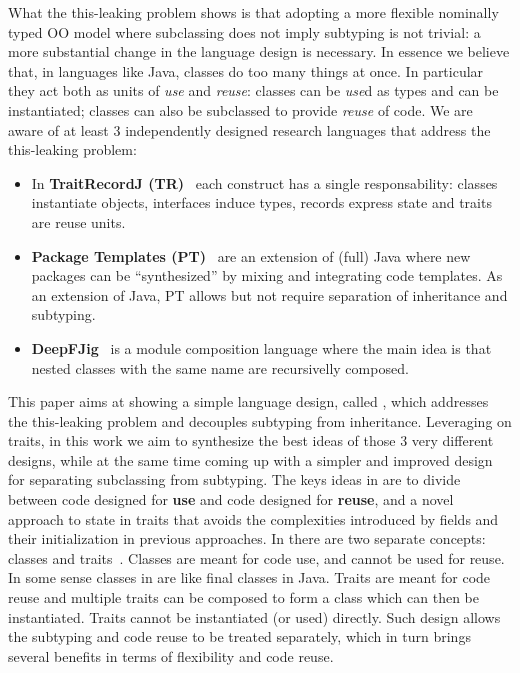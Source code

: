 What the this-leaking problem shows is that adopting a more flexible
nominally typed OO model where subclassing does not imply subtyping is
not trivial: a more substantial change in the language design is
necessary.  In essence we believe that, in languages like Java, classes do too many
things at once. In particular they act both as units of \emph{use} and
\emph{reuse}: classes can be \emph{use}d as types and can be instantiated;
classes can also be subclassed to provide \emph{reuse} of code.
We are aware of at least 3 independently designed research
languages that address the this-leaking problem:
\begin{itemize}
\item In {\bf TraitRecordJ (TR)}~\cite{Bettini:2010:ISP:1774088.1774530,BETTINI2013521,Bettini2015282}
each  construct has a single responsability: classes instantiate objects,
interfaces induce types, records express state and traits are reuse units.
\item {\bf Package Templates (PT)}~\cite{KrogdahlMS09,DBLP:journals/taosd/AxelsenSKM12,DBLP:conf/gpce/AxelsenK12}
are an extension of (full) Java where new packages can be ``synthesized'' by mixing
and integrating code templates. As an extension of Java, PT allows but not require
separation of inheritance and subtyping.
\item {\bf
    DeepFJig}~\cite{deep,servetto2014meta,fjig} is
a module composition language where the main idea is that
nested classes with the same name are recursivelly composed.
\end{itemize}
This paper aims at showing a simple language design, called \name,
which addresses the this-leaking problem and decouples subtyping from inheritance.
Leveraging on traits, in this work we aim to synthesize the best ideas
of those 3 very different designs, while at the same time coming up with a simpler and
improved design for separating subclassing from subtyping.
The keys ideas in \name are to divide between code designed for
\textbf{use} and code designed for \textbf{reuse}, and a novel
approach to state in traits that avoids the complexities introduced by
fields and their initialization in previous approaches.
In \name there are two separate concepts: classes
and traits~\cite{Traits:ECOOP2003}. Classes are meant for code use, and cannot be used
for reuse. In some sense classes in \name are like final classes in
Java. Traits are meant for code reuse and multiple traits can be
composed to form a class which can then be instantiated. Traits 
cannot be instantiated (or used) directly. Such design allows the
subtyping and code reuse to be treated separately, which in turn
brings several benefits in terms of flexibility and code reuse.

